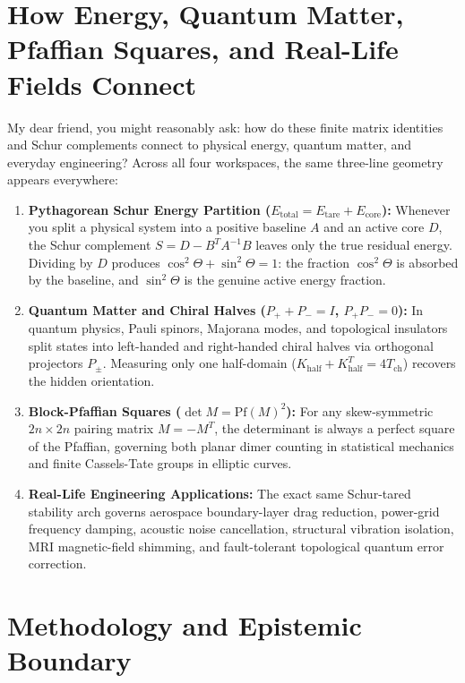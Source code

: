 \documentclass[11pt,a4paper]{article}
\theoremstyle{definition}
\begin{document}
\section{How Energy, Quantum Matter, Pfaffian Squares, and Real-Life Fields Connect}

My dear friend, you might reasonably ask: how do these finite matrix identities and Schur complements connect to physical energy, quantum matter, and everyday engineering? Across all four workspaces, the same three-line geometry appears everywhere:

\begin{enumerate}
  \item \textbf{Pythagorean Schur Energy Partition ($E_{\mathrm{total}} = E_{\mathrm{tare}} + E_{\mathrm{core}}$):} Whenever you split a physical system into a positive baseline $A$ and an active core $D$, the Schur complement $S = D - B^T A^{-1} B$ leaves only the true residual energy. Dividing by $D$ produces $\cos^2\Theta + \sin^2\Theta = 1$: the fraction $\cos^2\Theta$ is absorbed by the baseline, and $\sin^2\Theta$ is the genuine active energy fraction.
  \item \textbf{Quantum Matter and Chiral Halves ($P_+ + P_- = I$, $P_+ P_- = 0$):} In quantum physics, Pauli spinors, Majorana modes, and topological insulators split states into left-handed and right-handed chiral halves via orthogonal projectors $P_\pm$. Measuring only one half-domain ($K_{\mathrm{half}} + K_{\mathrm{half}}^T = 4 T_{\mathrm{ch}}$) recovers the hidden orientation.
  \item \textbf{Block-Pfaffian Squares ($\det M = \mathrm{Pf}(M)^2$):} For any skew-symmetric $2n \times 2n$ pairing matrix $M = -M^T$, the determinant is always a perfect square of the Pfaffian, governing both planar dimer counting in statistical mechanics and finite Cassels-Tate groups in elliptic curves.
  \item \textbf{Real-Life Engineering Applications:} The exact same Schur-tared stability arch governs aerospace boundary-layer drag reduction, power-grid frequency damping, acoustic noise cancellation, structural vibration isolation, MRI magnetic-field shimming, and fault-tolerant topological quantum error correction.
\end{enumerate}

\section{Methodology and Epistemic Boundary}
\end{document}
